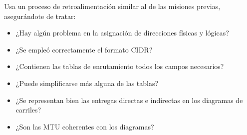 Usa un proceso de retroalimentación similar al de las misiones previas, asegurándote de tratar:
\begin{itemize}
\item ¿Hay algún problema en la asignación de direcciones físicas y lógicas?\\[-0.5cm]
\item ¿Se empleó correctamente el formato CIDR?\\[-0.5cm]
\item ¿Contienen las tablas de enrutamiento todos los campos necesarios?\\[-0.5cm]
\item ¿Puede simplificarse más alguna de las tablas?\\[-0.5cm]
\item ¿Se representan bien las entregas directas e indirectas en los diagramas de carriles?\\[-0.5cm]
\item ¿Son las MTU coherentes con los diagramas?
\end{itemize}


